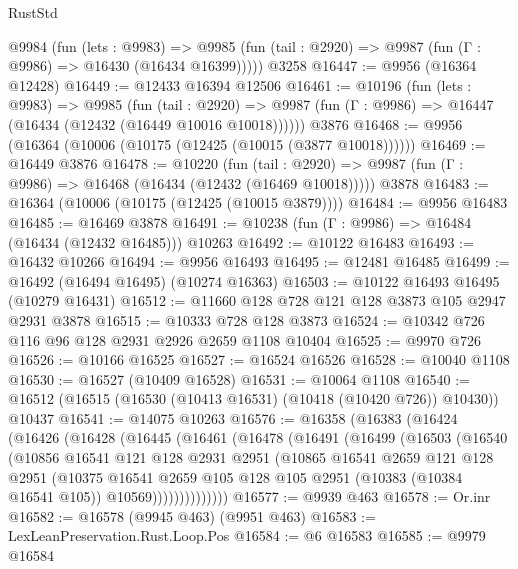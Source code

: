 \begin{lexlean}{RustStd}
\begin{coremodule}
    @9984
      (fun (lets : @9983) =>
      @9985 (fun (tail : @2920) => @9987 (fun (Γ : @9986) => @16430 (@16434 @16399)))))
    @3258
@16447 := @9956 (@16364 @12428)
@16449 := @12433 @16394 @12506
@16461 := @10196
    (fun (lets : @9983) =>
    @9985
      (fun (tail : @2920) =>
      @9987 (fun (Γ : @9986) => @16447 (@16434 (@12432 (@16449 @10016 @10018))))))
    @3876
@16468 := @9956 (@16364 (@10006 (@10175 (@12425 (@10015 (@3877 @10018))))))
@16469 := @16449 @3876
@16478 := @10220
    (fun (tail : @2920) => @9987 (fun (Γ : @9986) => @16468 (@16434 (@12432 (@16469 @10018)))))
    @3878
@16483 := @16364 (@10006 (@10175 (@12425 (@10015 @3879))))
@16484 := @9956 @16483
@16485 := @16469 @3878
@16491 := @10238 (fun (Γ : @9986) => @16484 (@16434 (@12432 @16485))) @10263
@16492 := @10122 @16483
@16493 := @16432 @10266
@16494 := @9956 @16493
@16495 := @12481 @16485
@16499 := @16492 (@16494 @16495) (@10274 @16363)
@16503 := @10122 @16493 @16495 (@10279 @16431)
@16512 := @11660 @128 @728 @121 @128 @3873 @105 @2947 @2931 @3878
@16515 := @10333 @728 @128 @3873
@16524 := @10342 @726 @116 @96 @128 @2931 @2926 @2659 @1108 @10404
@16525 := @9970 @726
@16526 := @10166 @16525
@16527 := @16524 @16526
@16528 := @10040 @1108
@16530 := @16527 (@10409 @16528)
@16531 := @10064 @1108
@16540 := @16512 (@16515 (@16530 (@10413 @16531) (@10418 (@10420 @726)) @10430)) @10437
@16541 := @14075 @10263
@16576 := @16358
    (@16383
      (@16424
        (@16426
          (@16428
            (@16445
              (@16461
                (@16478
                  (@16491
                    (@16499
                      (@16503
                        (@16540
                          (@10856
                            @16541
                            @121
                            @128
                            @2931
                            @2951
                            (@10865
                              @16541
                              @2659
                              @121
                              @128
                              @2951
                              (@10375
                                @16541
                                @2659
                                @105
                                @128
                                @105
                                @2951
                                (@10383 (@10384 @16541 @105))
                                @10569))))))))))))))
@16577 := @9939 @463
@16578 := Or.inr
@16582 := @16578 (@9945 @463) (@9951 @463)
@16583 := LexLeanPreservation.Rust.Loop.Pos
@16584 := @6 @16583
@16585 := @9979 @16584

\end{coremodule}
\end{lexlean}
